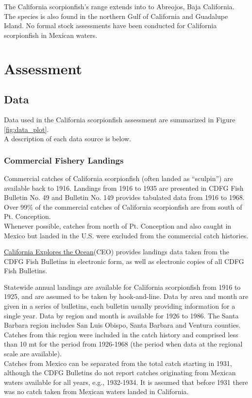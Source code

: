 \documentclass[12pt,]{article}
\begin{document}
The California scorpionfish's range extends into to Abreojos, Baja
California.\\
The species is also found in the northern Gulf of California and
Guadalupe Island. No formal stock assessments have been conducted for
California scorpionfish in Mexican waters.

\section{Assessment}\label{assessment}

\subsection{Data}\label{data}

Data used in the California scorpionfish assessment are summarized in
Figure \ref{fig:data_plot}.\\
A description of each data source is below.

\subsubsection{Commercial Fishery
Landings}\label{commercial-fishery-landings}

Commercial catches of California scorpionfish (often landed as
``sculpin'') are available back to 1916. Landings from 1916 to 1935 are
presented in CDFG Fish Bulletin No. 49 and Bulletin No. 149 provides
tabulated data from 1916 to 1968. Over 99\% of the commercial catches of
California scorpionfish are from south of Pt. Conception.\\
Whenever possible, catches from north of Pt. Conception and also caught
in Mexico but landed in the U.S. were excluded from the commercial catch
histories.

\href{http://library.ucsd.edu/ceo/fishcatchtables/fish-catch-download.html}{California
Explores the Ocean}(CEO) provides landings data taken from the CDFG Fish
Bulletins in electronic form, as well as electronic copies of all CDFG
Fish Bulletins.

Statewide annual landings are available for California scorpionfish from
1916 to 1925, and are assumed to be taken by hook-and-line. Data by area
and month are given in a series of bulletins, each bulletin usually
providing information for a single year. Data by region and month is
available for 1926 to 1986. The Santa Barbara region includes San Luis
Obispo, Santa Barbara and Ventura counties. Catches from this region
were included in the catch history and comprised less than 10 mt for the
period from 1926-1968 (the period when data at the regional scale are
available).\\
Catches from Mexico can be separated from the total catch starting in
1931, although the CDFG Bulletins do not report catches originating from
Mexican waters available for all years, e.g., 1932-1934. It is assumed
that before 1931 there was no catch taken from Mexican waters landed in
California.
\end{document}
